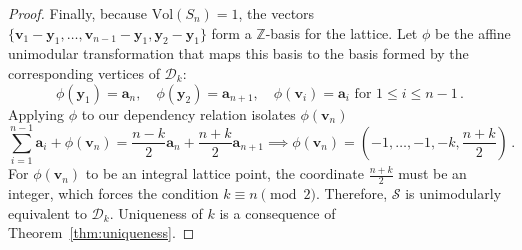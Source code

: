 \documentclass[10pt,a4paper]{amsart}
\newcommand{\Ss}{{\mathcal S}}
\begin{document}
\begin{proof}
Finally, because $\text{Vol}(S_n) = 1$, the vectors $\{\bm{v}_1 - \bm{y}_1, \dots, \bm{v}_{n-1} - \bm{y}_1, \bm{y}_2 - \bm{y}_1\}$ 
form a $\mathbb{Z}$-basis for the lattice. Let $\phi$ be the affine unimodular transformation that maps this basis to the basis 
formed by the corresponding vertices of $\mathcal{D}_k$:
\[ 
\phi(\bm{y}_1) = \bm{a}_n, \quad \phi(\bm{y}_2) = \bm{a}_{n+1}, \quad \phi(\bm{v}_i) = \bm{a}_i \text{ for } 1 \le i \le n-1\,.
\]
Applying $\phi$ to our dependency relation isolates $\phi(\bm{v}_n)$
\[
\sum_{i=1}^{n-1} \bm{a}_i + \phi(\bm{v}_n) = \frac{n-k}{2} \bm{a}_n + \frac{n+k}{2} \bm{a}_{n+1} \implies 
\phi(\bm{v}_n) = \left(-1, \dots, -1, -k, \frac{n+k}{2}\right) \,.
\]
For $\phi(\bm{v}_n)$ to be an integral lattice point, the coordinate $\frac{n+k}{2}$ must be an integer, which forces the condition 
$k \equiv n \pmod 2$. Therefore, $\Ss$ is unimodularly equivalent to $\mathcal{D}_k$. Uniqueness of $k$ is a consequence
of Theorem~\ref{thm:uniqueness}.
\end{proof}
\end{document}
